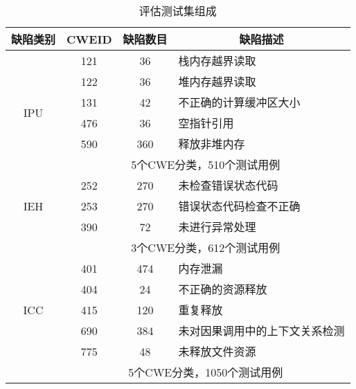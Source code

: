 \begin{table}[b]
	\centering
	\begin{minipage}[t]{0.8\linewidth} %
		\caption{评估测试集组成}
		\label{tab:3-4-cwe}
		\begin{tabular}{cccl}
			\hline
			{缺陷类别 } & {CWEID} & 缺陷数目 & \multicolumn{1}{c}{缺陷描述} \\
			\hline
			\multirow{6}{*}{IPU} & 121 & 36 & 栈内存越界读取\\
			& 122 & 36 & 堆内存越界读取 \\
			& 131 & 42 & 不正确的计算缓冲区大小\\
			& 476 & 36 & 空指针引用\\
			& 590 & 360 & 释放非堆内存\\
			& \multicolumn{3}{c}{5个CWE分类，510个测试用例} \\
			\hline
			\multirow{3}{*}{IEH} & 252 & 270 & 未检查错误状态代码\\
			& 253 & 270 & 错误状态代码检查不正确\\
			& 390 & 72 & 未进行异常处理\\
			& \multicolumn{3}{c}{3个CWE分类，612个测试用例} \\
			\hline
			\multirow{5}{*}{ICC} & 401 & 474 & 内存泄漏\\
			& 404 & 24 & 不正确的资源释放\\
			& 415 & 120 & 重复释放\\
			& 690 & 384 & 未对因果调用中的上下文关系检测\\
			& 775 & 48 & 未释放文件资源\\
			& \multicolumn{3}{c}{5个CWE分类，1050个测试用例} \\
			\hline
		\end{tabular}
	\end{minipage}
\end{table}